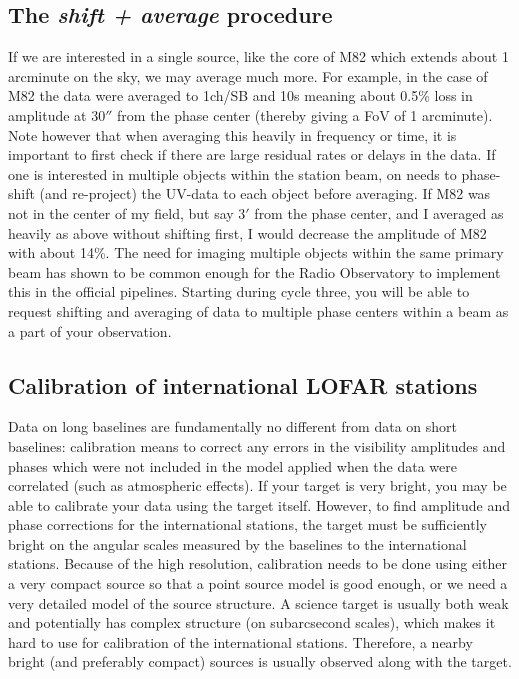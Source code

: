 \subsection{The \emph{shift + average} procedure}
\label{sect:shift+average}
If we are interested in a single source, like the core of M82 which extends about 1 arcminute on the sky, we may average 
much more. For example, in the case of M82 the data were averaged to 1ch/SB and 10s meaning about 0.5\% loss in amplitude
at 30$''$ from the phase center (thereby giving a FoV of 1 arcminute). 
Note however that when averaging this heavily in frequency or time, it is important to first check if there are large residual rates or delays in the data.
If one is interested in multiple objects within the station beam, on needs to phase-shift (and re-project) the UV-data to each object before averaging.
If M82 was not in the center of my field, but say 3$'$ from the phase center, and I averaged as heavily as above without shifting first, I would
decrease the amplitude of M82 with about 14\%.
The need for imaging multiple objects within the same primary beam has shown to be common enough for the Radio Observatory to implement this 
in the official pipelines. Starting during cycle three, you will be able to request shifting and averaging of data to multiple phase centers within a beam 
as a part of your observation. 

\subsection{Calibration of international LOFAR stations}
Data on long baselines are fundamentally no different from data on short
baselines: calibration means to correct any errors in the visibility amplitudes
and phases which were not included in the model applied when the data were
correlated (such as atmospheric effects).  If your target is very bright, you
may be able to calibrate your data using the target itself.  However, to find
amplitude and phase corrections for the international stations, the target must
be sufficiently bright on the angular scales measured by the baselines to the
international stations.  Because of the high resolution, calibration needs to
be done using either a very compact source so that a point source model is good
enough, or we need a very detailed model of the source structure. A science
target is usually both weak and potentially has complex structure (on
subarcsecond scales), which makes it hard to use for calibration of the
international stations. Therefore, a nearby bright (and preferably compact)
sources is usually observed along with the target. 

